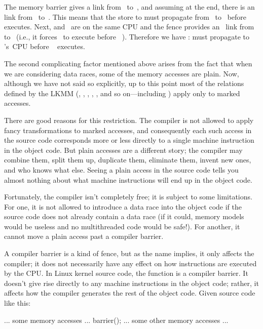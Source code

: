 The  memory barrier gives a  link
from~ to~, and
assuming  at the end, there is an  link from~
to~.
This
means that the store to  must propagate from~ to~
before ~%
executes.
Next,  and~ are on the same CPU and the  fence
provides an ~link from~ to~ (i.e., it forces~
to execute before~%
).
Therefore we have :
 must propagate to 's~CPU before ~%
executes.

The second complicating factor mentioned above arises from the fact
that when we are considering data races, some of the memory accesses
are plain.
Now, although we have not said so explicitly, up to this
point most of the relations defined by the LKMM (, , ,
, , and so on---including ) apply only to marked
accesses.

There are good reasons for this restriction.
The compiler is not
allowed to apply fancy transformations to marked accesses, and
consequently each such access in the source code corresponds more or
less directly to a single machine instruction in the object code.
But
plain accesses are a different story; the compiler may combine them,
split them up, duplicate them, eliminate them, invent new ones, and
who knows what else.
Seeing a plain access in the source code tells
you almost nothing about what machine instructions will end up in the
object code.

Fortunately, the compiler isn't completely free; it is subject to some
limitations.
For one, it is not allowed to introduce a data race into
the object code if the source code does not already contain a data
race (if it could, memory models would be useless and no multithreaded
code would be safe!).
For another, it cannot move a plain access past
a compiler barrier.

A compiler barrier is a kind of fence, but as the name implies, it
only affects the compiler; it does not necessarily have any effect on
how instructions are executed by the CPU\@.
In Linux kernel source
code, the  function is a compiler barrier.
It doesn't give
rise directly to any machine instructions in the object code; rather,
it affects how the compiler generates the rest of the object code.
Given source code like this:

\begin{VerbatimU}
	... some memory accesses ...
	barrier();
	... some other memory accesses ...
\end{VerbatimU}

